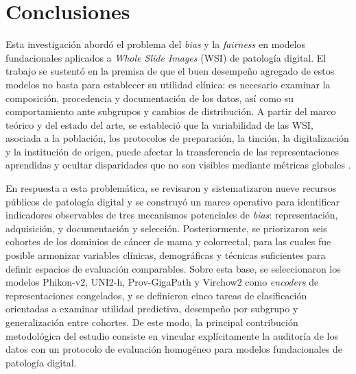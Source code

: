 \chapter{Conclusiones}
\label{cap:conclusiones}

Esta investigación abordó el problema del \textit{bias} y la \textit{fairness} en modelos fundacionales aplicados a \textit{Whole Slide Images} (WSI) de patología digital. El trabajo se sustentó en la premisa de que el buen desempeño agregado de estos modelos no basta para establecer su utilidad clínica: es necesario examinar la composición, procedencia y documentación de los datos, así como su comportamiento ante subgrupos y cambios de distribución. A partir del marco teórico y del estado del arte, se estableció que la variabilidad de las WSI, asociada a la población, los protocolos de preparación, la tinción, la digitalización y la institución de origen, puede afectar la transferencia de las representaciones aprendidas y ocultar disparidades que no son visibles mediante métricas globales \parencite{Basak2023,NEURIPS2024_c9826b9e}.

En respuesta a esta problemática, se revisaron y sistematizaron nueve recursos públicos de patología digital y se construyó un marco operativo para identificar indicadores observables de tres mecanismos potenciales de \textit{bias}: representación, adquisición, y documentación y selección. Posteriormente, se priorizaron seis cohortes de los dominios de cáncer de mama y colorrectal, para las cuales fue posible armonizar variables clínicas, demográficas y técnicas suficientes para definir espacios de evaluación comparables. Sobre esta base, se seleccionaron los modelos Phikon-v2, UNI2-h, Prov-GigaPath y Virchow2 como \textit{encoders} de representaciones congelados, y se definieron cinco tareas de clasificación orientadas a examinar utilidad predictiva, desempeño por subgrupo y generalización entre cohortes. De este modo, la principal contribución metodológica del estudio consiste en vincular explícitamente la auditoría de los datos con un protocolo de evaluación homogéneo para modelos fundacionales de patología digital.

